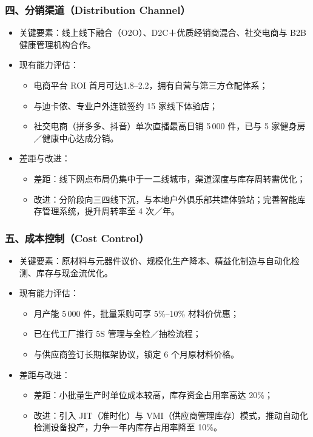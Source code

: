 \documentclass[UTF8]{report}
\theoremstyle{MyLineTheoremStyle} %
\theoremstyle{MyBlockTheoremStyle} %
\theoremstyle{MySubsubsectionStyle} %
\begin{document}
  \subsubsection{四、分销渠道（Distribution Channel）}
    \begin{itemize}
      \item 关键要素：线上线下融合（O2O）、D2C＋优质经销商混合、社交电商与 B2B 健康管理机构合作。  
      \item 现有能力评估：
        \begin{itemize}
          \item 电商平台 ROI 首月可达1.8–2.2，拥有自营与第三方仓配体系；  
          \item 与迪卡侬、专业户外连锁签约 15 家线下体验店；  
          \item 社交电商（拼多多、抖音）单次直播最高日销 5\,000 件，已与 5 家健身房／健康中心达成分销。
        \end{itemize}
      \item 差距与改进：
        \begin{itemize}
          \item 差距：线下网点布局仍集中于一二线城市，渠道深度与库存周转需优化；  
          \item 改进：分阶段向三四线下沉，与本地户外俱乐部共建体验站；完善智能库存管理系统，提升周转率至 4 次／年。
        \end{itemize}
    \end{itemize}

  \subsubsection{五、成本控制（Cost Control）}
    \begin{itemize}
      \item 关键要素：原材料与元器件议价、规模化生产降本、精益化制造与自动化检测、库存与现金流优化。  
      \item 现有能力评估：
        \begin{itemize}
          \item 月产能 5\,000 件，批量采购可享 5\%–10\% 材料价优惠；  
          \item 已在代工厂推行 5S 管理与全检／抽检流程；  
          \item 与供应商签订长期框架协议，锁定 6 个月原材料价格。
        \end{itemize}
      \item 差距与改进：
        \begin{itemize}
          \item 差距：小批量生产时单位成本较高，库存资金占用率高达 20\%；  
          \item 改进：引入 JIT（准时化）与 VMI（供应商管理库存）模式，推动自动化检测设备投产，力争一年内库存占用率降至 10\%。
        \end{itemize}
    \end{itemize}
\end{document}
